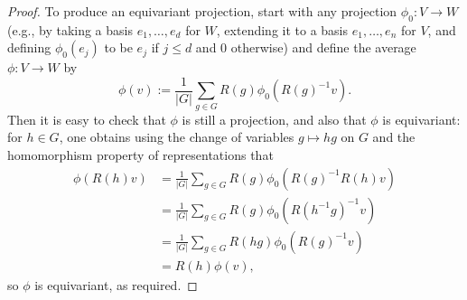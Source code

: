 \documentclass[reqno]{amsart} 
\begin{document}
\begin{proof}
  To produce an equivariant projection,
  start with any projection $\phi_0 : V \rightarrow W$
  (e.g., by taking a basis $e_1,\dotsc,e_d$ for $W$, extending
  it to a basis $e_1,\dotsc,e_n$ for $V$,
  and defining $\phi_0(e_j)$ to be $e_j$ if $j \leq d$ and $0$
  otherwise)
  and define the average $\phi : V \rightarrow W$ by
  \begin{equation*}
    \phi(v) := \frac{1}{|G|} \sum_{g \in G}
    R(g) \phi_0(R(g)^{-1} v).
  \end{equation*}
  Then it is easy to check that $\phi$ is still a projection,
  and also that $\phi$ is equivariant:
  for $h \in G$,
  one obtains using the change of variables $g \mapsto h g$
  on $G$ and the homomorphism property of representations
  that
  \begin{align*}
    \phi(R(h) v)
    &=
     \frac{1}{|G|} \sum_{g \in G}
      R(g) \phi_0(R(g)^{-1} R(h) v)
      \\
    &=
     \frac{1}{|G|} \sum_{g \in G}
      R(g) \phi_0(R(h^{-1} g)^{-1} v)
      \\
    &=
     \frac{1}{|G|} \sum_{g \in G}
      R(h g) \phi_0(R(g)^{-1} v)
      \\
    &=
      R(h) \phi(v),
  \end{align*}
  so $\phi$ is equivariant, as required.
\end{proof}
\end{document}
